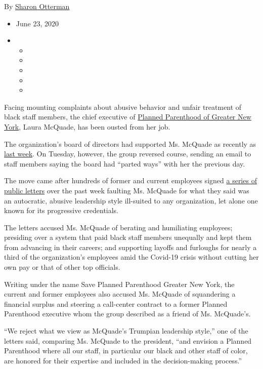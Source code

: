 By \href{https://www.nytimes3xbfgragh.onion/by/sharon-otterman}{Sharon
Otterman}

\begin{itemize}
\item
  June 23, 2020
\item
  \begin{itemize}
  \item
  \item
  \item
  \item
  \item
  \end{itemize}
\end{itemize}

Facing mounting complaints about abusive behavior and unfair treatment
of black staff members, the chief executive of
\href{https://www.nytimes3xbfgragh.onion/2020/07/21/nyregion/planned-parenthood-margaret-sanger-eugenics.html}{Planned
Parenthood of Greater New York}, Laura McQuade, has been ousted from her
job.

The organization's board of directors had supported Ms. McQuade as
recently as
\href{https://saveppgny.files.wordpress.com/2020/06/ppgny-board-statement-6-19-20.pdf}{last
week}. On Tuesday, however, the group reversed course, sending an email
to staff members saying the board had ``parted ways'' with her the
previous day.

The move came after hundreds of former and current employees signed
\href{https://saveppgny.wordpress.com/}{a series of public letters} over
the past week faulting Ms. McQuade for what they said was an autocratic,
abusive leadership style ill-suited to any organization, let alone one
known for its progressive credentials.

The letters accused Ms. McQuade of berating and humiliating employees;
presiding over a system that paid black staff members unequally and kept
them from advancing in their careers; and supporting layoffs and
furloughs for nearly a third of the organization's employees amid the
Covid-19 crisis without cutting her own pay or that of other top
officials.

Writing under the name Save Planned Parenthood Greater New York, the
current and former employees also accused Ms. McQuade of squandering a
financial surplus and steering a call-center contract to a former
Planned Parenthood executive whom the group described as a friend of Ms.
McQuade's.

``We reject what we view as McQuade's Trumpian leadership style,'' one
of the letters said, comparing Ms. McQuade to the president, ``and
envision a Planned Parenthood where all our staff, in particular our
black and other staff of color, are honored for their expertise and
included in the decision-making process.''

